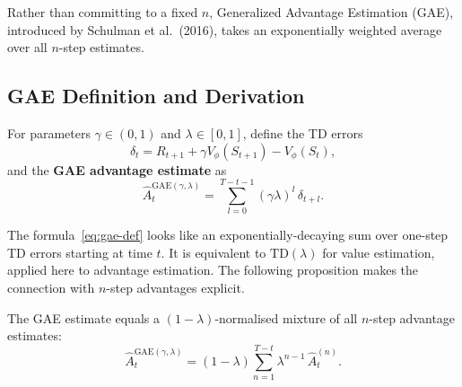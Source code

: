 Rather than committing to a fixed $n$, Generalized Advantage Estimation (GAE),
introduced by Schulman et al.~(2016), takes an exponentially weighted average
over all $n$-step estimates.

\subsection{GAE Definition and Derivation}

\begin{definition}
\label{def:gae-ch9}
For parameters $\gamma \in (0,1)$ and $\lambda \in [0,1]$, define the
TD errors
\[
\delta_t = R_{t+1} + \gamma V_\phi(S_{t+1}) - V_\phi(S_t),
\]
and the \textbf{GAE advantage estimate} as
\begin{equation}
\label{eq:gae-def}
\hat{A}_t^{\mathrm{GAE}(\gamma,\lambda)}
= \sum_{l=0}^{T-t-1} (\gamma\lambda)^l\,\delta_{t+l}.
\end{equation}
\end{definition}

The formula~\eqref{eq:gae-def} looks like an exponentially-decaying sum
over one-step TD errors starting at time $t$.  It is equivalent to
$\mathrm{TD}(\lambda)$ for value estimation, applied here to advantage
estimation.  The following proposition makes the connection with $n$-step
advantages explicit.

\begin{proposition}
\label{prop:gae-nstep}
The GAE estimate equals a $(1-\lambda)$-normalised mixture of all $n$-step
advantage estimates:
\begin{equation}
\label{eq:gae-nstep}
\hat{A}_t^{\mathrm{GAE}(\gamma,\lambda)}
= (1-\lambda)\sum_{n=1}^{T-t} \lambda^{n-1}\,\hat{A}_t^{(n)}.
\end{equation}
\end{proposition}

